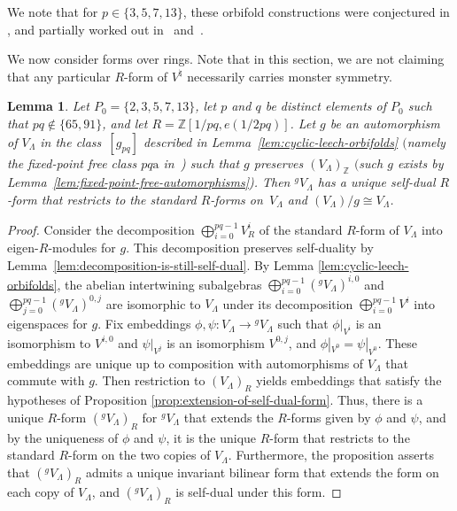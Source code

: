 \documentclass[11pt]{article}
\newcommand{\bZ}{\mathbb{Z}}
\newtheorem{lem}[thm]{Lemma}
\theoremstyle{definition}
\begin{document}
We note that for $p \in \{3,5,7,13\}$, these orbifold constructions were conjectured in \cite{FLM88}, and partially worked out in~\cite{DM94b} and~\cite{M95}.

We now consider forms over rings. Note that in this section, we are not claiming that any particular $R$-form of $V^\natural$ necessarily carries monster symmetry.

\begin{lem} \label{lem:R-form-for-ALY-algebra}Let $P_0 = \{ 2,3,5,7,13\}$, let $p$ and $q$ be distinct elements of $P_0$ such that $pq \not\in \{65, 91\}$, and let $R = \bZ[1/pq, e(1/2pq)]$. Let $g$ be an automorphism of $V_\Lambda$ in the class~$[g_{pq}]$ described in Lemma~{\rm \ref{lem:cyclic-leech-orbifolds}} $($namely the fixed-point free class $pq\mathrm{a}$ in~{\rm \cite{GAP})} such that $g$ preserves $(V_\Lambda)_\bZ$ $($such $g$ exists by Lemma~{\rm \ref{lem:fixed-point-free-automorphisms})}. Then ${}^gV_\Lambda$ has a unique self-dual $R$-form that restricts to the standard $R$-forms on~$V_\Lambda$ and $(V_\Lambda)/g \cong V_\Lambda$.
\end{lem}
\begin{proof}Consider the decomposition $\bigoplus_{i=0}^{pq-1} V^i_R$ of the standard $R$-form of $V_\Lambda$ into eigen-$R$-modules for $g$. This decomposition preserves self-duality by Lemma~\ref{lem:decomposition-is-still-self-dual}. By Lemma \ref{lem:cyclic-leech-orbifolds}, the abelian intertwining subalgebras $\bigoplus_{i=0}^{pq-1} ({}^gV_\Lambda)^{i,0}$ and $\bigoplus_{j=0}^{pq-1} ({}^gV_\Lambda)^{0,j}$ are isomorphic to $V_\Lambda$ under its decomposition $\bigoplus_{i=0}^{pq-1} V^i$ into eigenspaces for $g$. Fix embeddings $\phi, \psi\colon V_\Lambda \to {}^gV_\Lambda$ such that $\phi|_{V^i}$ is an isomorphism to $V^{i,0}$ and $\psi|_{V^j}$ is an isomorphism $V^{0,j}$, and $\phi|_{V^0} = \psi|_{V^0}$. These embeddings are unique up to composition with automorphisms of $V_\Lambda$ that commute with $g$. Then restriction to $(V_\Lambda)_R$ yields embeddings that satisfy the hypotheses of Proposition \ref{prop:extension-of-self-dual-form}. Thus, there is a unique $R$-form $({}^gV_\Lambda)_R$ for ${}^gV_\Lambda$ that extends the $R$-forms given by $\phi$ and $\psi$, and by the uniqueness of $\phi$ and $\psi$, it is the unique $R$-form that restricts to the standard $R$-form on the two copies of $V_\Lambda$. Furthermore, the proposition asserts that $({}^gV_\Lambda)_R$ admits a unique invariant bilinear form that extends the form on each copy of $V_\Lambda$, and $({}^gV_\Lambda)_R$ is self-dual under this form.
\end{proof}
\end{document}
